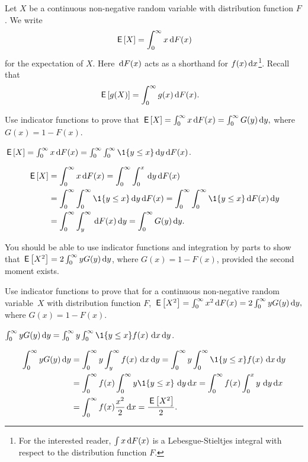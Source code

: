 Let $X$ be a continuous non-negative random variable with distribution function $F$. We write 
\begin{equation*}
 \,\mathsf{E}\left[X\right] = \int_0^\infty x \,\text{d}F(x)
\end{equation*}
for the expectation of $X$. Here $\,\text{d}F(x)$ acts as a shorthand for $f(x) \,\text{d}x$\footnote{For the interested reader, $\int x \,\text{d}F(x)$ is a Lebesgue-Stieltjes integral with respect to the distribution function $F$.}. Recall that
\begin{align*}
\,\mathsf{E}\left[g(X)\right] &= \int_0^\infty g(x) \,\text{d}F(x).
\end{align*}



\begin{exercise}
 Use indicator functions to prove that 
$ \,\mathsf{E}\left[X\right] = \int_0^\infty x \,\text{d}F(x) = \int_0^\infty G(y) \,\text{d}y,$
where $G(x) = 1 - F(x)$. 
\begin{hint}
$\E X = \int_0^\infty x \d F(x) = \int_0^\infty \int_0^\infty \1{y\leq x} \d y \d F(x)$.
\end{hint}
\begin{solution}
 \begin{align*}
 \E{X} &= \int_0^\infty x \d F(x) = \int_0^\infty \int_0^x \d y \d F(x) \\
 & = \int_0^\infty \int_0^\infty \1{y\leq x} \d y \d F(x) = \int_0^\infty \int_0^\infty \1{y\leq x} \d F(x) \d y\\
 & = \int_0^\infty \int_y^\infty \d F(x) \d y = \int_0^\infty G(y) \d y.
 \end{align*}
\end{solution}
\end{exercise}

You should be able to use indicator functions and integration by parts to show that $\,\mathsf{E}\left[X^2\right] = 2\int_0^\infty y G(y) \,\text{d}y$, where $G(x) = 1- F(x)$, provided the second moment exists.

\begin{extra}
 Use indicator functions to prove that for a continuous non-negative random variable~$X$ with distribution function $F$, $ \,\mathsf{E}\left[X^2\right] = \int_0^\infty x^2 \,\text{d}F(x) = 2 \int_0^\infty y G(y) \,\text{d}y,$ where $G(x) = 1 - F(x)$.
\begin{hint}
$\int_0^\infty y G(y) \d y = \int_0^\infty y \int_0^\infty \1{y\leq x}f(x)\, \d x \d y$.
\end{hint}
\begin{solution}
 \begin{align*}
\int_0^\infty y G(y) \d y 
&= \int_0^\infty y \int_y^\infty f(x)\, \d x \d y = \int_0^\infty y \int_0^\infty \1{y\leq x}f(x)\, \d x \d y\\
&= \int_0^\infty f(x) \int_0^\infty y \1{y \leq x}\, \d y \d x
= \int_0^\infty f(x) \int_0^x y\, \d y \d x\\
&= \int_0^\infty f(x) \frac{x^2}2 \d x =\frac{\E{X^2}}2.
 \end{align*}
\end{solution}
\end{extra}

